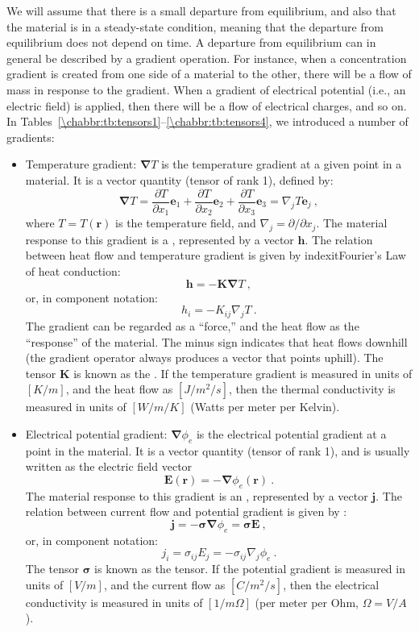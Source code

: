 We will assume that there is a small departure from equilibrium, and also that the material is in a steady-state condition, meaning that the departure from equilibrium does not depend on time.  A departure from equilibrium can in general be described by a gradient operation. For instance, when a concentration gradient is created from one side of a material to the other, there will be a flow of mass in response to the gradient.  When a gradient of electrical potential (i.e., an electric field) is applied, then there will be a flow of electrical charges, and so on.  In Tables~\ref{\chabbr:tb:tensors1}--\ref{\chabbr:tb:tensors4}, we introduced a number of gradients:
\begin{itemize}
	\item Temperature gradient: $\bm{\nabla} T$ is the temperature gradient at a given point in a material.  It is a vector quantity (tensor of rank 1), defined by:
		\[
		\bm{\nabla} T = \frac{\partial T}{\partial x_1}\mathbf{e}_1+
		\frac{\partial T}{\partial x_2}\mathbf{e}_2+
		\frac{\partial T}{\partial x_3}\mathbf{e}_3 = \nabla_j T\mathbf{e}_j\ ,
		\]
		where $T=T(\mathbf{r})$ is the temperature field, and $\nabla_j=\partial/\partial x_j$.  The material response to this gradient is a , represented by a vector $\mathbf{h}$.  The relation between heat flow and temperature gradient is given by indexit{Fourier's Law of heat conduction}:
	\begin{equation}
		\mathbf{h} = -\bm{K}\bm{\nabla} T\ ,\label{\chabbr:eq:FouriersLaw}
	\end{equation}
	or, in component notation:
	\[
		h_i = -K_{ij}\nabla_j T\ .
	\]
	The gradient can be regarded as a ``force,'' and the heat flow as the ``response'' of the material.  The minus sign indicates that heat flows downhill (the gradient operator always produces a vector that points uphill).  The tensor $\bm{K}$ is known as the .  If the temperature gradient is measured in units of $[K/m]$, and the heat flow as $[J/m^2/s]$, then the thermal conductivity is measured in units of $[W/m/K]$ (Watts per meter per Kelvin).
		
	\item Electrical potential gradient: $\bm{\nabla} \phi_e$ is the electrical potential gradient at a point in the material.  It is a vector quantity (tensor of rank 1), and is usually written as the electric field vector 
	\[
		\mathbf{E}(\mathbf{r}) = -\bm{\nabla} \phi_e(\mathbf{r})\ .
	\]
	The material response to this gradient is an , represented by a vector $\mathbf{j}$.  The relation between current flow and potential gradient is given by :
	\begin{equation}
		\mathbf{j} = -\bm{\sigma}\bm{\nabla} \phi_e = \bm{\sigma}\mathbf{E}\ ,\label{\chabbr:eq:OhmsLaw}
	\end{equation}
	or, in component notation:
	\[
		j_i = \sigma_{ij}E_j=-\sigma_{ij}\nabla_j\phi_e\ .
	\]
	The tensor $\bm{\sigma}$ is known as the  tensor.  If the potential gradient is measured in units of $[V/m]$, and the current flow as $[C/m^2/s]$, then the electrical conductivity is measured in units of $[1/m \Omega]$ (per meter per Ohm, $\Omega = V/A$).
	

\end{itemize}
